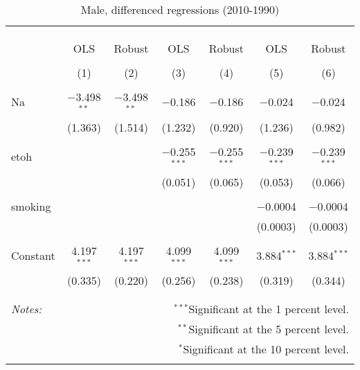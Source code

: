 \documentclass[11pt]{article}\usepackage[]{graphicx}\usepackage[]{color}
\begin{document}
\begin{table}[!htbp] \centering 
  \caption{Male, differenced regressions (2010-1990)} 
  \label{tab:mlm} 
\begin{tabular}{@{\extracolsep{5pt}}lcccccc} 
\\[-1.8ex]\hline 
\hline \\[-1.8ex] 
\\[-1.8ex] & \multicolumn{6}{c}{ } \\ 
 & OLS & Robust & OLS & Robust & OLS & Robust \\ 
\\[-1.8ex] & (1) & (2) & (3) & (4) & (5) & (6)\\ 
\hline \\[-1.8ex] 
 Na & $-$3.498$^{**}$ & $-$3.498$^{**}$ & $-$0.186 & $-$0.186 & $-$0.024 & $-$0.024 \\ 
  & (1.363) & (1.514) & (1.232) & (0.920) & (1.236) & (0.982) \\ 
  & & & & & & \\ 
 etoh &  &  & $-$0.255$^{***}$ & $-$0.255$^{***}$ & $-$0.239$^{***}$ & $-$0.239$^{***}$ \\ 
  &  &  & (0.051) & (0.065) & (0.053) & (0.066) \\ 
  & & & & & & \\ 
 smoking &  &  &  &  & $-$0.0004 & $-$0.0004 \\ 
  &  &  &  &  & (0.0003) & (0.0003) \\ 
  & & & & & & \\ 
 Constant & 4.197$^{***}$ & 4.197$^{***}$ & 4.099$^{***}$ & 4.099$^{***}$ & 3.884$^{***}$ & 3.884$^{***}$ \\ 
  & (0.335) & (0.220) & (0.256) & (0.238) & (0.319) & (0.344) \\ 
  & & & & & & \\ 
\hline 
\hline \\[-1.8ex] 
\textit{Notes:} & \multicolumn{6}{r}{$^{***}$Significant at the 1 percent level.} \\ 
 & \multicolumn{6}{r}{$^{**}$Significant at the 5 percent level.} \\ 
 & \multicolumn{6}{r}{$^{*}$Significant at the 10 percent level.} \\ 
 & \multicolumn{6}{r}{} \\ 
\end{tabular} 
\end{table} 
\end{document}
